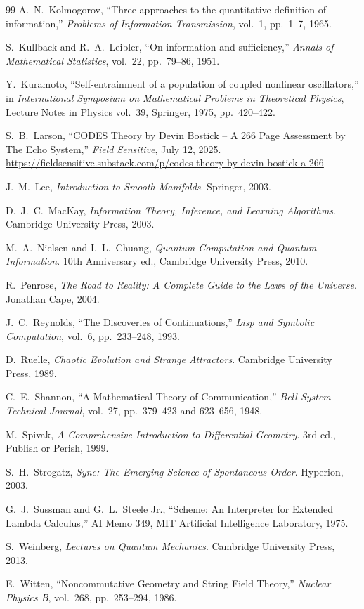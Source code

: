\documentclass[12pt]{article}
\begin{document}
\begin{thebibliography}{99}
A.~N.~Kolmogorov,
``Three approaches to the quantitative definition of information,''
\textit{Problems of Information Transmission}, vol.~1, pp.~1--7, 1965.

S.~Kullback and R.~A.~Leibler,
``On information and sufficiency,''
\textit{Annals of Mathematical Statistics}, vol.~22, pp.~79--86, 1951.

Y.~Kuramoto,
``Self-entrainment of a population of coupled nonlinear oscillators,''
in \textit{International Symposium on Mathematical Problems in Theoretical Physics},
Lecture Notes in Physics vol.~39, Springer, 1975, pp.~420--422.

S.~B.~Larson,
``CODES Theory by Devin Bostick -- A 266 Page Assessment by The Echo System,''
\textit{Field Sensitive}, July 12, 2025.
\url{https://fieldsensitive.substack.com/p/codes-theory-by-devin-bostick-a-266}

J.~M.~Lee,
\textit{Introduction to Smooth Manifolds}.
Springer, 2003.

D.~J.~C.~MacKay,
\textit{Information Theory, Inference, and Learning Algorithms}.
Cambridge University Press, 2003.

M.~A.~Nielsen and I.~L.~Chuang,
\textit{Quantum Computation and Quantum Information}.
10th Anniversary ed., Cambridge University Press, 2010.

R.~Penrose,
\textit{The Road to Reality: A Complete Guide to the Laws of the Universe}.
Jonathan Cape, 2004.

J.~C.~Reynolds,
``The Discoveries of Continuations,''
\textit{Lisp and Symbolic Computation}, vol.~6, pp.~233--248, 1993.

D.~Ruelle,
\textit{Chaotic Evolution and Strange Attractors}.
Cambridge University Press, 1989.

C.~E.~Shannon,
``A Mathematical Theory of Communication,''
\textit{Bell System Technical Journal}, vol.~27, pp.~379--423 and 623--656, 1948.

M.~Spivak,
\textit{A Comprehensive Introduction to Differential Geometry}.
3rd ed., Publish or Perish, 1999.

S.~H.~Strogatz,
\textit{Sync: The Emerging Science of Spontaneous Order}.
Hyperion, 2003.

G.~J.~Sussman and G.~L.~Steele Jr.,
``Scheme: An Interpreter for Extended Lambda Calculus,''
AI Memo 349, MIT Artificial Intelligence Laboratory, 1975.

S.~Weinberg,
\textit{Lectures on Quantum Mechanics}.
Cambridge University Press, 2013.

E.~Witten,
``Noncommutative Geometry and String Field Theory,''
\textit{Nuclear Physics B}, vol.~268, pp.~253--294, 1986.

\end{thebibliography}
\end{document}
